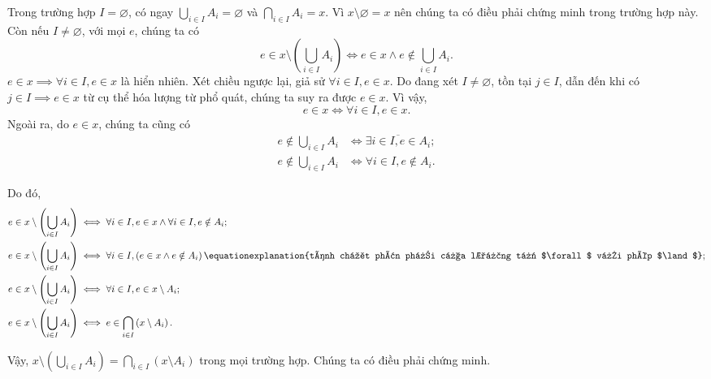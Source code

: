 Trong trường hợp $I = \varnothing$, có ngay $\bigcup_{i \in I}A_i = \varnothing$ và $\bigcap_{i \in I}A_i = x$. Vì $x \setminus \varnothing = x$ nên chúng ta có điều phải chứng minh trong trường hợp này. Còn nếu $I \neq \varnothing$, với mọi $e$, chúng ta có 
\begin{equation*}
   e \in x \setminus \left(\bigcup_{i \in I}A_i\right) \iff e \in x \land e \notin \bigcup_{i \in I}A_i.
\end{equation*}
$e \in x \implies \forall i \in I, e \in x$ là hiển nhiên. Xét chiều ngược lại, giả sử $\forall i \in I, e \in x$. Do đang xét $I \neq \varnothing$, tồn tại $j \in I$, dẫn đến khi có $j \in I \implies e \in x$ từ cụ thể hóa lượng từ phổ quát, chúng ta suy ra được $e \in x$. Vì vậy, \begin{equation*}
   e \in x \iff \forall i \in I, e \in x.
\end{equation*} 
Ngoài ra, do $e \in x$, chúng ta cũng có 
\begin{align*}
   e \notin \bigcup_{i \in I}A_i &\iff \overline{\exists i \in I, e \in A_i}; \\
   e \notin \bigcup_{i \in I}A_i &\iff \forall i \in I, e \notin A_i.
\end{align*}

Do đó, \begin{align*}
   e \in x \setminus \left(\bigcup_{i \in I}A_i\right) &\iff \forall i \in I, e \in x \land \forall i \in I, e \notin A_i; \\
   e \in x \setminus \left(\bigcup_{i \in I}A_i\right) &\iff \forall i \in I, \left(e \in x \land e \notin A_i\right) \equationexplanation{tính chất phân phối của lượng từ $\forall$ với phép $\land$}; \\
   e \in x \setminus \left(\bigcup_{i \in I}A_i\right) &\iff \forall i \in I, e \in x \setminus A_i; \\
   e \in x \setminus \left(\bigcup_{i \in I}A_i\right) &\iff e \in \bigcap_{i \in I} \left(x \setminus A_i\right).
\end{align*}

Vậy, $x \setminus \left(\bigcup_{i \in I}A_i\right) = \bigcap_{i \in I} \left(x \setminus A_i\right)$ trong mọi trường hợp. Chúng ta có điều phải chứng minh.

